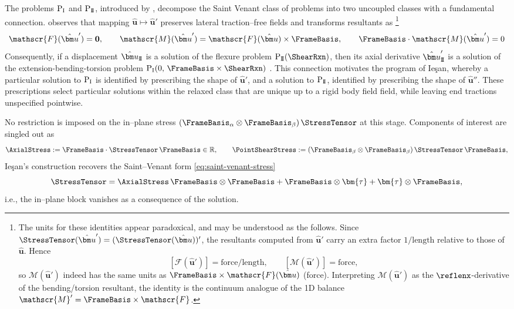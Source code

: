 The problems \(\mathrm{P}_{\rm I}\) and \(\mathrm{P}_{\rm I\!I}\), introduced by \cite{iesan1986saintvenants}, decompose the Saint Venant class of problems into two uncoupled classes with a fundamental connection. 
\cite{iesan1986saintvenants} observes that mapping \(\hat{\bm u}\mapsto \hat{\bm u}'\) preserves lateral traction–free fields and transforms resultants as  \citep[Thm~2.1]{iesan1986saintvenants}\footnote{
The units for these identities appear paradoxical, and may be understood as the follows. Since \(\StressTensor(\hat{\bm u}')=(\StressTensor(\hat{\bm u}))'\), the resultants computed from \(\hat{\bm u}'\) carry an extra factor \(1/\text{length}\) relative to those of \(\hat{\bm u}\). 
Hence
\[
[\mathscr{F}(\hat{\bm u}')]=\text{force}/\text{length},\qquad
[\mathscr{M}(\hat{\bm u}')]=\text{force},
\]
so \(\mathscr{M}(\hat{\bm u}')\) indeed has the same units as \(\FrameBasis\times\mathscr{F}(\hat{\bm u})\) (force). Interpreting \(\mathscr{M}(\hat{\bm u}')\) as the \(\reflenx\)-derivative of the bending/torsion resultant, the identity is the continuum analogue of the 1D balance \(\mathscr{M}'=\FrameBasis\times \mathscr{F}\).
}
\[
\mathscr{F}(\hat{\bm u}')=\mathbf{0}, 
\qquad 
\mathscr{M}(\hat{\bm u}')=\mathscr{F}(\hat{\bm u})\times\FrameBasis,
\qquad
\FrameBasis\cdot\mathscr{M}(\hat{\bm u}')=0
\] 
Consequently, if a displacement \(\hat{\bm u}_{\rm I\!I}\) is a solution of the flexure problem \(\mathrm{P}_{\rm I\!I}(\ShearRxn)\), then its axial derivative \(\hat{\bm u}'_{\rm I\!I}\) is a solution of the extension-bending-torsion problem \(\mathrm{P}_{\rm I}(0,\,\FrameBasis\times\ShearRxn)\) \citep{iesan1987saintvenants}. %
This connection motivates the program of Ie\c{s}an, whereby a particular solution to \(\mathrm{P}_{\rm I}\) is identified by prescribing the shape of \(\hat{\bm u}'\), and a solution to \(\mathrm{P}_{\rm I\!I}\), identified by prescribing the shape of \(\hat{\bm u}''\). 
These prescriptions select particular solutions within the relaxed class that are unique up to a rigid body field field, while leaving end tractions unspecified pointwise.

\begin{remark}
No restriction is imposed on the in–plane stress \((\FrameBasis_\alpha\otimes\FrameBasis_\beta)\,\StressTensor\) at this stage. 
Components of interest are singled out as
\[
\AxialStress:=\FrameBasis\cdot\StressTensor\,\FrameBasis\in\mathbb{R},
\qquad
\PointShearStress :=(\FrameBasis_\beta\otimes\FrameBasis_\beta)\,\StressTensor\,\FrameBasis,
\]
Ie\c{s}an’s construction recovers the Saint–Venant form \eqref{eq:saint-venant-stress}
\begin{equation*}
\StressTensor = \AxialStress\,\FrameBasis\otimes\FrameBasis
+\FrameBasis\otimes\bm{\tau}+\bm{\tau}\otimes\FrameBasis,
\end{equation*}
i.e., the in–plane block vanishes as a consequence of the solution.
\end{remark}


